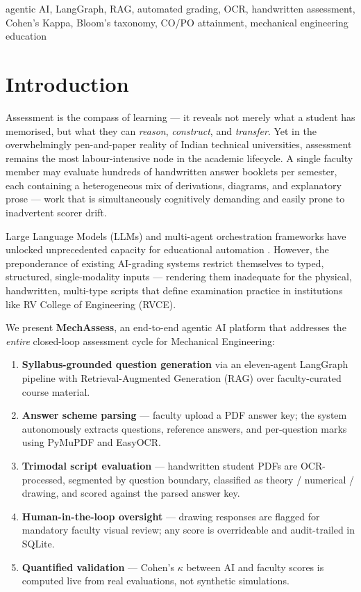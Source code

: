 \documentclass[conference]{IEEEtran}
\begin{document}
\begin{IEEEkeywords}
agentic AI, LangGraph, RAG, automated grading, OCR, handwritten assessment, Cohen's Kappa, Bloom's taxonomy, CO/PO attainment, mechanical engineering education
\end{IEEEkeywords}

\section{Introduction}
\label{sec:intro}

Assessment is the compass of learning — it reveals not merely what a student has memorised, but what they can \emph{reason}, \emph{construct}, and \emph{transfer}. Yet in the overwhelmingly pen-and-paper reality of Indian technical universities, assessment remains the most labour-intensive node in the academic lifecycle. A single faculty member may evaluate hundreds of handwritten answer booklets per semester, each containing a heterogeneous mix of derivations, diagrams, and explanatory prose — work that is simultaneously cognitively demanding and easily prone to inadvertent scorer drift.

Large Language Models (LLMs) and multi-agent orchestration frameworks have unlocked unprecedented capacity for educational automation \cite{kasneci2023chatgpt}. However, the preponderance of existing AI-grading systems restrict themselves to typed, structured, single-modality inputs — rendering them inadequate for the physical, handwritten, multi-type scripts that define examination practice in institutions like RV College of Engineering (RVCE).

We present \textbf{MechAssess}, an end-to-end agentic AI platform that addresses the \emph{entire} closed-loop assessment cycle for Mechanical Engineering:

\begin{enumerate}
    \item \textbf{Syllabus-grounded question generation} via an eleven-agent LangGraph pipeline with Retrieval-Augmented Generation (RAG) over faculty-curated course material.
    \item \textbf{Answer scheme parsing} — faculty upload a PDF answer key; the system autonomously extracts questions, reference answers, and per-question marks using PyMuPDF and EasyOCR.
    \item \textbf{Trimodal script evaluation} — handwritten student PDFs are OCR-processed, segmented by question boundary, classified as theory / numerical / drawing, and scored against the parsed answer key.
    \item \textbf{Human-in-the-loop oversight} — drawing responses are flagged for mandatory faculty visual review; any score is overrideable and audit-trailed in SQLite.
    \item \textbf{Quantified validation} — Cohen's $\kappa$ between AI and faculty scores is computed live from real evaluations, not synthetic simulations.
\end{enumerate}
\end{document}
